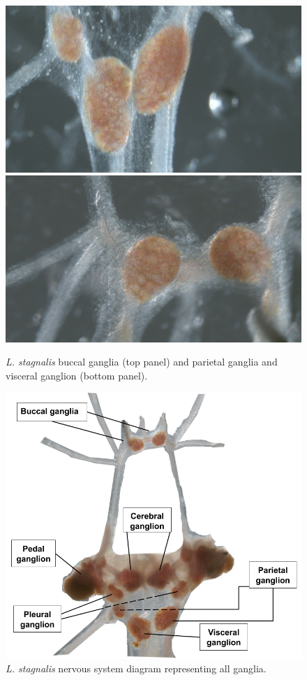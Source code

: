 \begin{figure}[hbt!]
	\centering
	\includegraphics[width=0.9\linewidth]{img/methods/preparation/RPG.JPG}
	\vspace{6pt}
	\includegraphics[angle=180,width=0.9\linewidth]{img/methods/preparation/buccal_ganglia.JPG}
	\caption{\textit{L. stagnalis} buccal ganglia (top panel) and parietal ganglia and visceral ganglion (bottom panel).}
	\label{fig:buccal ganglia}
	\endminipage
	\centering
	\includegraphics[width=\linewidth]{img/methods/CNS_diagram.png}
	\caption{\textit{L. stagnalis} nervous system diagram representing all ganglia.} 
	\label{fig:lymn neural sys diagram}
	\endminipage
\end{figure}

